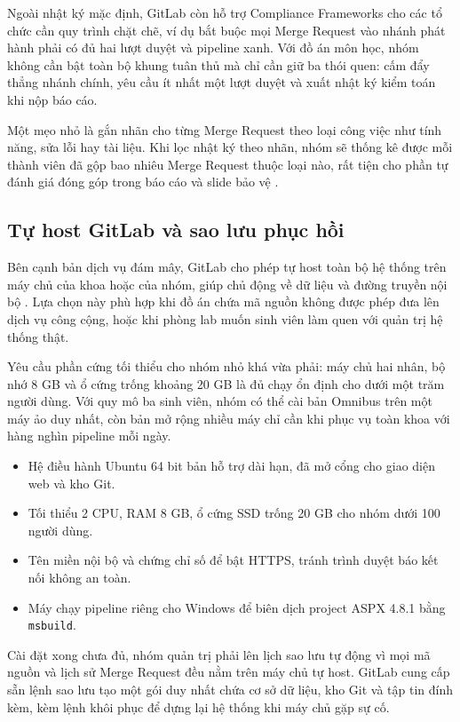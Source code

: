 Ngoài nhật ký mặc định, GitLab còn hỗ trợ Compliance Frameworks cho các tổ chức cần quy trình chặt chẽ, ví dụ bắt buộc mọi Merge Request vào nhánh phát hành phải có đủ hai lượt duyệt và pipeline xanh. Với đồ án môn học, nhóm không cần bật toàn bộ khung tuân thủ mà chỉ cần giữ ba thói quen: cấm đẩy thẳng nhánh chính, yêu cầu ít nhất một lượt duyệt và xuất nhật ký kiểm toán khi nộp báo cáo.

Một mẹo nhỏ là gắn nhãn cho từng Merge Request theo loại công việc như tính năng, sửa lỗi hay tài liệu. Khi lọc nhật ký theo nhãn, nhóm sẽ thống kê được mỗi thành viên đã gộp bao nhiêu Merge Request thuộc loại nào, rất tiện cho phần tự đánh giá đóng góp trong báo cáo và slide bảo vệ \cite{atlassiangit}.

\subsection{Tự host GitLab và sao lưu phục hồi}

Bên cạnh bản dịch vụ đám mây, GitLab cho phép tự host toàn bộ hệ thống trên máy chủ của khoa hoặc của nhóm, giúp chủ động về dữ liệu và đường truyền nội bộ \cite{gitlabdocs}. Lựa chọn này phù hợp khi đồ án chứa mã nguồn không được phép đưa lên dịch vụ công cộng, hoặc khi phòng lab muốn sinh viên làm quen với quản trị hệ thống thật.

Yêu cầu phần cứng tối thiểu cho nhóm nhỏ khá vừa phải: máy chủ hai nhân, bộ nhớ 8 GB và ổ cứng trống khoảng 20 GB là đủ chạy ổn định cho dưới một trăm người dùng. Với quy mô ba sinh viên, nhóm có thể cài bản Omnibus trên một máy ảo duy nhất, còn bản mở rộng nhiều máy chỉ cần khi phục vụ toàn khoa với hàng nghìn pipeline mỗi ngày.

\begin{itemize}
    \item Hệ điều hành Ubuntu 64 bit bản hỗ trợ dài hạn, đã mở cổng cho giao diện web và kho Git.
    \item Tối thiểu 2 CPU, RAM 8 GB, ổ cứng SSD trống 20 GB cho nhóm dưới 100 người dùng.
    \item Tên miền nội bộ và chứng chỉ số để bật HTTPS, tránh trình duyệt báo kết nối không an toàn.
    \item Máy chạy pipeline riêng cho Windows để biên dịch project ASPX 4.8.1 bằng \verb|msbuild|.
\end{itemize}

Cài đặt xong chưa đủ, nhóm quản trị phải lên lịch sao lưu tự động vì mọi mã nguồn và lịch sử Merge Request đều nằm trên máy chủ tự host. GitLab cung cấp sẵn lệnh sao lưu tạo một gói duy nhất chứa cơ sở dữ liệu, kho Git và tập tin đính kèm, kèm lệnh khôi phục để dựng lại hệ thống khi máy chủ gặp sự cố.

